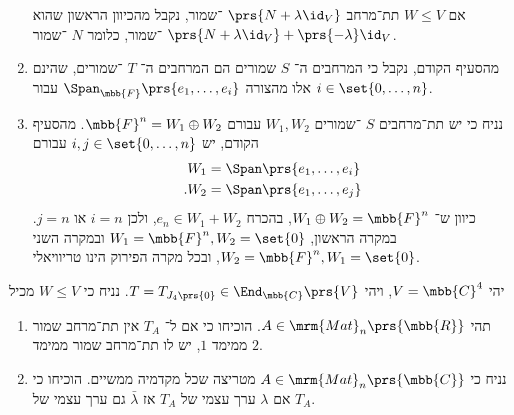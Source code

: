 \documentclass[a4paper,10pt,twoside,openany]{book}
\begin{document}
\begin{solution}
\begin{enumerate}
אם
$W \leq V$
תת־מרחב
$\prs{N + \lambda \id_V}$%
־שמור, נקבל מהכיוון הראשון שהוא
$\prs{N + \lambda \id_V} + \prs{-\lambda}\id_V$%
־שמור, כלומר
$N$%
־שמור.

\item
מהסעיף הקודם, נקבל כי המרחבים ה־%
$S$
שמורים הם המרחבים ה־%
$T$%
־שמורים, שהינם אלו מהצורה
$\Span_{\mbb{F}}\prs{e_1, \ldots, e_i}$
עבור
$i \in \set{0, \ldots, n}$.

\item
נניח כי יש תת־מרחבים
$S$%
־שמורים
$W_1, W_2$
עבורם
$\mbb{F}^n = W_1 \oplus W_2$.
מהסעיף הקודם, יש
$i,j \in \set{0, \ldots, n}$
עבורם
\begin{align*}
W_1 &= \Span\prs{e_1, \ldots, e_i} \\
\text{.} W_2 &= \Span\prs{e_1, \ldots, e_j}
\end{align*}
כיוון ש־%
$W_1 \oplus W_2 = \mbb{F}^n$,
בהכרח
$e_n \in W_1 + W_2$,
ולכן
$i = n$
או
$j = n$.
במקרה הראשון,
$W_1 = \mbb{F}^n, W_2 = \set{0}$
ובמקרה השני
$W_2 = \mbb{F}^n, W_1 = \set{0}$,
ובכל מקרה הפירוק הינו טריוויאלי.
\end{enumerate}
\end{solution}

\begin{example}
יהי
$V = \mbb{C}^4$,
ויהי
$T = T_{J_4\prs{0}} \in \End_{\mbb{C}}\prs{V}$.
נניח כי
$W \leq V$
מכיל
\end{example}

\begin{exercisechap}
\begin{enumerate}
\item תהי
$A \in \mrm{Mat}_n\prs{\mbb{R}}$.
הוכיחו כי אם ל־%
$T_A$
אין תת־מרחב שמור ממימד
$1$,
יש לו תת־מרחב שמור ממימד
$2$.

\item נניח כי
$A \in \mrm{Mat}_n\prs{\mbb{C}}$
מטריצה שכל מקדמיה ממשיים. הוכיחו כי אם
$\lambda$
ערך עצמי של
$T_A$
אז
$\bar{\lambda}$
גם ערך עצמי של
$T_A$.
\end{enumerate}
\end{exercisechap}
\end{document}
